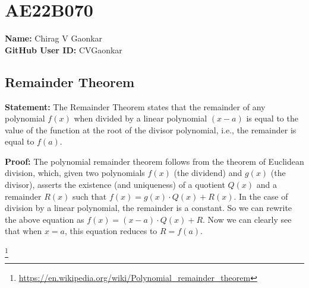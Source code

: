 \documentclass{article}
\begin{document}
\section*{AE22B070}

\textbf{Name:} Chirag V Gaonkar \\
\textbf{GitHub User ID:} CVGaonkar

\subsection*{Remainder Theorem}

\textbf{Statement:}
The Remainder Theorem states that the remainder of any polynomial \(f(x)\) when divided by a linear polynomial \((x-a)\) is equal to the value of the function at the root of the divisor polynomial,
 i.e., the remainder is equal to \(f(a)\).

\textbf{Proof:}
The polynomial remainder theorem follows from the theorem of Euclidean division, which, given two polynomials \(f(x)\) (the dividend) and \(g(x)\) (the divisor), asserts the existence (and uniqueness)
 of a quotient \(Q(x)\) and a remainder \(R(x)\) such that \(f(x) = g(x) \cdot Q(x) + R(x)\). In the case of division by a linear polynomial, the remainder is a constant. So we can rewrite the above
 equation as \(f(x) = (x-a) \cdot Q(x) + R\). Now we can clearly see that when \(x=a\), this equation reduces to \(R = f(a)\).

\footnote{\url{https://en.wikipedia.org/wiki/Polynomial_remainder_theorem}}
\end{document}
